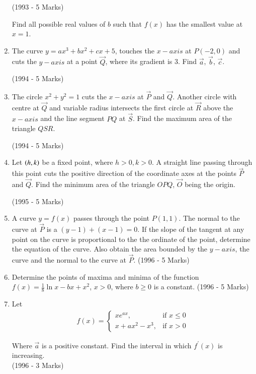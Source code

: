 \documentclass[journal]{IEEEtran}
\begin{document}
\begin{enumerate}
\hfill (1993 - 5 Marks)

Find all possible real values of $b$ such that $f(x)$ has the smallest value at $x=1$.

\item The curve $y = ax^3 + bx^2 + cx + 5$, touches the $x-axis$ at $P(-2,0)$ and cuts the $y-axis$ at a point $\vec{Q}$, where its gradient is 3. Find $\vec{a}$, $\vec{b}$, $\vec{c}$.

\hfill (1994 - 5 Marks)

\item The circle $x^2 + y^2 = 1$ cuts the $x-axis$ at $\vec{P}$ and $\vec{Q}$. Another circle with centre at $\vec{Q}$ and variable radius intersects the first circle at $\vec{R}$ above the $x-axis$ and the line segment $PQ$ at $\vec{S}$. Find the maximum area of the triangle $QSR$.

\hfill (1994 - 5 Marks)


\item Let $\left(h,k\right)$ be a fixed point, where $h>0, k>0$. A straight line passing through this point cuts the positive direction of the coordinate axes at the points $\vec{P}$ and $\vec{Q}$. Find the minimum area of the triangle $OPQ$, $\vec{O}$ being the origin.

\hfill{(1995 - 5 Marks)}


\item A curve $y=f(x)$ passes through the point $P(1,1)$. The normal to the curve at $\vec{P}$ is a $(y-1) + (x-1) = 0$. If the slope of the tangent at any point on the curve is proportional to the the ordinate of the point, determine the equation of the curve. Also obtain the area bounded by the $y-axis$, the curve and the normal to the curve at $\vec{P}$.
\hfill (1996 - 5 Marks)

\item Determine the points of maxima and minima of the function $f(x) = \frac{1}{8}\ln{x} - bx + x^2$, $x>0$, where $b \geq 0$ is a constant.
\hfill (1996 - 5 Marks)


\item Let 
\begin{align*}
f(x) = \begin{cases}
xe^{ax}, & \text{if } x \leq 0\\
x+ax^2 - x^3, & \text{if } x > 0
\end{cases}
\end{align*}

Where $\vec{a}$ is a positive constant. Find the interval in which $f^{\prime}(x)$ is increasing.\\
\hfill (1996 - 3 Marks)


\end{enumerate}
\end{document}
